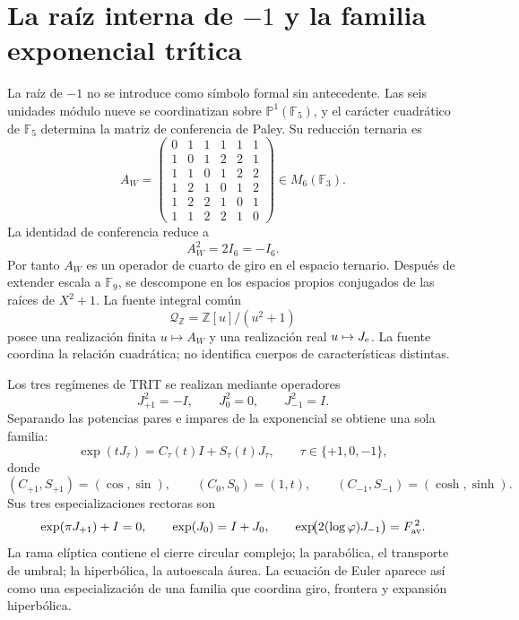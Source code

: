 \label{chap:p3-83-26-raiz_menos_uno}

\section*{La raíz interna de \texorpdfstring{\(-1\)}{-1} y la familia exponencial trítica}

La raíz de \(-1\) no se introduce como símbolo formal sin antecedente. Las
seis unidades módulo nueve se coordinatizan sobre
\(\mathbb P^1(\mathbb F_5)\), y el carácter cuadrático de
\(\mathbb F_5\) determina la matriz de conferencia de Paley. Su reducción
ternaria es
\[
 A_W=
 \begin{pmatrix}
 0&1&1&1&1&1\\
 1&0&1&2&2&1\\
 1&1&0&1&2&2\\
 1&2&1&0&1&2\\
 1&2&2&1&0&1\\
 1&1&2&2&1&0
 \end{pmatrix}\in M_6(\mathbb F_3).
\]
La identidad de conferencia reduce a
\begin{equation}\label{p3-83-c26-s1:eq:constantes-raiz-interna-menos-uno}
 \boxed{A_W^2=2I_6=-I_6.}
\end{equation}
Por tanto \(A_W\) es un operador de cuarto de giro en el espacio ternario.
Después de extender escala a \(\mathbb F_9\), se descompone en los espacios
propios conjugados de las raíces de \(X^2+1\). La fuente integral común
\[
 \mathcal Q_{\mathbb Z}=\mathbb Z[u]/(u^2+1)
\]
posee una realización finita \(u\mapsto A_W\) y una realización real
\(u\mapsto J_{\rm e}\). La fuente coordina la relación cuadrática; no
identifica cuerpos de características distintas.

Los tres regímenes de TRIT se realizan mediante operadores
\[
 J_{+1}^2=-I,\qquad J_0^2=0,\qquad J_{-1}^2=I.
\]
Separando las potencias pares e impares de la exponencial se obtiene una
sola familia:
\begin{equation}\label{p3-83-c26-s1:eq:constantes-euler-extendido}
 \boxed{
 \exp(tJ_\tau)=C_\tau(t)I+S_\tau(t)J_\tau,
 \qquad \tau\in\{+1,0,-1\},}
\end{equation}
donde
\[
 (C_{+1},S_{+1})=(\cos,\sin),\qquad
 (C_0,S_0)=(1,t),\qquad
 (C_{-1},S_{-1})=(\cosh,\sinh).
\]
Sus tres especializaciones rectoras son
\begin{equation}\label{p3-83-c26-s1:eq:constantes-euler-tres-ramas}
 \exp(\pi J_{+1})+I=0,\qquad
 \exp(J_0)=I+J_0,\qquad
 \exp\!\bigl(2(\log\varphi)J_{-1}\bigr)=F_{\rm av}^{\,2}.
\end{equation}
La rama elíptica contiene el cierre circular complejo; la parabólica, el
transporte de umbral; la hiperbólica, la autoescala áurea. La ecuación de
Euler aparece así como una especialización de una familia que coordina giro,
frontera y expansión hiperbólica.


